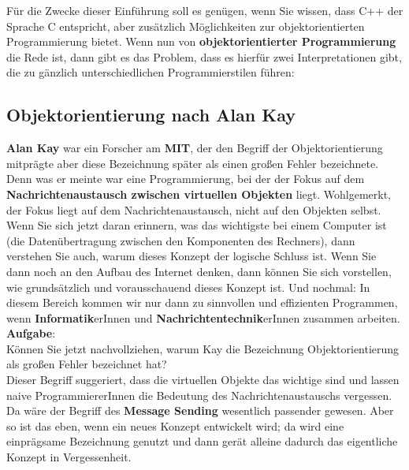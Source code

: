 Für die Zwecke dieser Einführung soll es genügen, wenn Sie wissen, dass C++ der Sprache C entspricht, aber zusätzlich Möglichkeiten zur objektorientierten Programmierung bietet. Wenn nun von \textbf{objektorientierter Programmierung} die Rede ist, dann gibt es das Problem, dass es hierfür zwei Interpretationen gibt, die zu gänzlich unterschiedlichen Programmierstilen führen:

\subsection{Objektorientierung nach Alan Kay}
\textbf{Alan Kay} war ein Forscher am \textbf{MIT}, der den Begriff der Objektorientierung mitprägte aber diese Bezeichnung später als einen großen Fehler bezeichnete. Denn was er meinte war eine Programmierung, bei der der Fokus auf dem \textbf{Nachrichtenaustausch zwischen virtuellen Objekten} liegt. Wohlgemerkt, der Fokus liegt auf dem Nachrichtenaustausch, nicht auf den Objekten selbst. \\

Wenn Sie sich jetzt daran erinnern, was das wichtigste bei einem Computer ist (die Datenübertragung zwischen den Komponenten des Rechners), dann verstehen Sie auch, warum dieses Konzept der logische Schluss ist. Wenn Sie dann noch an den Aufbau des Internet denken, dann können Sie sich vorstellen, wie grundsätzlich und vorausschauend dieses Konzept ist. Und nochmal: In diesem Bereich kommen wir nur dann zu sinnvollen und effizienten Programmen, wenn \textbf{Informatik}erInnen und \textbf{Nachrichtentechnik}erInnen zusammen arbeiten.\\

\textbf{Aufgabe}:\\
Können Sie jetzt nachvollziehen, warum Kay die Bezeichnung Objektorientierung als großen Fehler bezeichnet hat? \\

Dieser Begriff suggeriert, dass die virtuellen Objekte das wichtige sind und lassen naive ProgrammiererInnen die Bedeutung des Nachrichtenaustauschs vergessen. Da wäre der Begriff des \textbf{Message Sending} wesentlich passender gewesen. Aber so ist das eben, wenn ein neues Konzept entwickelt wird; da wird eine einprägsame Bezeichnung genutzt und dann gerät alleine dadurch das eigentliche Konzept in Vergessenheit.\\

